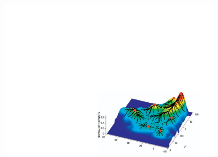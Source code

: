 \begin{frame}
\begin{columns}
\begin{figure}[!htbp]
				\newlinedouble
				\includegraphics[width=1\linewidth]{images/unsupervised/non_parametric/density_level_curve.pdf}
			\end{figure}

		\end{columns}


\end{frame}


